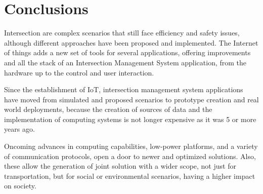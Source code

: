 \documentclass[conference]{IEEEtran}
\begin{document}
\section{Conclusions}

Intersection are complex scenarios that still face efficiency and safety issues, although different approaches have been proposed and implemented. The Internet of things adds a new set of tools for several applications, offering improvements and all the stack of an Intersection Management System application, from the hardware up to the control and user interaction.

Since the establishment of IoT, intersection management system applications have moved from simulated and proposed scenarios to prototype creation and real world deployments, because the creation of sources of data and the implementation of computing systems is not longer expensive as it was 5 or more years ago.

Oncoming advances in computing capabilities, low-power platforms, and a variety of communication protocols, open a door to newer and optimized solutions. Also, these allow the generation of joint solution with a wider scope, not just for transportation, but for social or environmental scenarios, having a higher impact on society.



\end{document}
